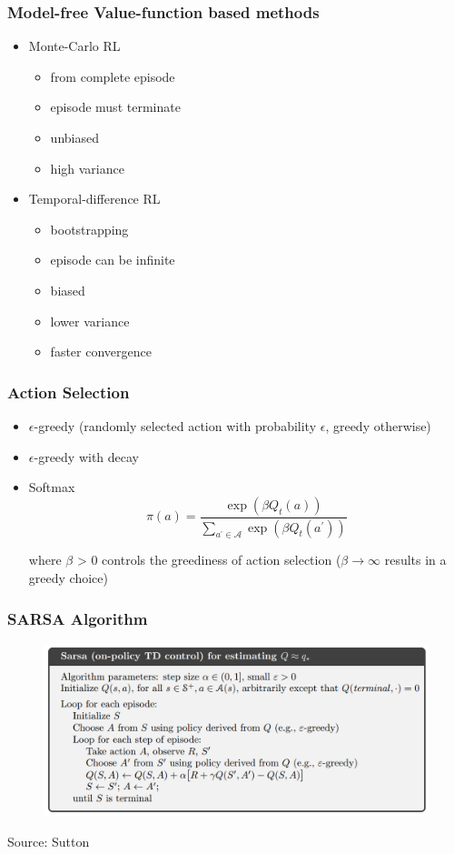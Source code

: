 \documentclass{beamer}
\begin{document}
\begin{frame}
\frametitle{Model-free Value-function based methods}

\begin{itemize}
	\item Monte-Carlo RL
		\begin{itemize}
			\item from complete episode 
			\item episode must terminate
			\item unbiased
			\item high variance
		\end{itemize}
	
	\item Temporal-difference RL
		\begin{itemize}
			\item bootstrapping
			\item episode can be infinite
			\item biased
			\item lower variance
			\item faster convergence
		\end{itemize}
		
\end{itemize}
\end{frame}


\begin{frame}
\frametitle{Action Selection}

\begin{itemize}
	\item $\epsilon$-greedy (randomly selected action 
	with probability $\epsilon$, greedy otherwise)
	\item $\epsilon$-greedy with decay
	\item Softmax
$$
\pi(a)=\frac{\exp \left(\beta Q_{t}(a)\right)}{\sum_{a^{\prime} \in \mathcal{A}} \exp \left(\beta Q_{t}\left(a^{\prime}\right)\right)}
$$
	
	where $\beta$ > 0 controls the greediness of action selection
	($\beta \rightarrow \infty$ results in a greedy choice)
\end{itemize}
\end{frame}


\begin{frame}
\frametitle{SARSA Algorithm}

\begin{figure}
	\includegraphics[scale=0.4]{sarsa}
\end{figure}

Source: Sutton

\end{frame}
\end{document}

